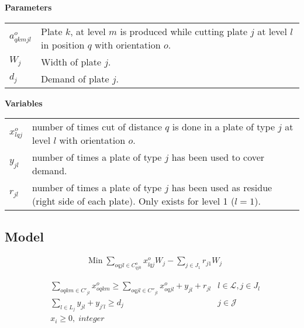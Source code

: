 \documentclass[a4paper,11pt]{article}
\begin{document}
    \vskip 0.3cm

    \textbf{Parameters}

    \begin{tabular}{p{20mm}p{120mm}}
        $a^o_{qkmjl}$ & Plate $k$, at level $m$ is produced while cutting plate $j$ at level $l$ in position $q$ with orientation $o$. \\
        $W_j$ & Width of plate $j$.\\
        $d_j$ & Demand of plate $j$.\\
    \end{tabular}

    \vskip 0.3cm

    \textbf{Variables}

    \begin{tabular}{p{20mm}p{120mm}}
        $x^o_{lqj}$ & number of times cut of distance $q$ is done in a plate of type $j$ at level $l$ with orientation $o$.\\
         $y_{jl}$ & number of times a plate of type $j$ has been used to cover demand.\\
         $r_{jl}$ & number of times a plate of type $j$ has been used as residue (right side of each plate). Only exists for level 1 ($l=1$).\\
    \end{tabular}

    \subsection{Model}

    \begin{align}
        & \text{Min}\; \sum_{oqjl \in C^o_{qj0}} x^o_{lqj} W_j - \sum_{j \in J_1} r_{j1} W_j
    \end{align}

    \begin{align}
        & \sum_{oqkm \in C'_{jl}} x^o_{oqkm} \geq \sum_{oqjl \in C''_{jl}} x^o_{oqjl} + y_{jl} + r_{jl}
            & l \in \mathcal{L}, j \in J_l \\
        & \sum_{l \in L_{j}} y_{jl} + y_{j'l} \geq d_j & j \in \mathcal{J} \\
        & x_{i} \geq 0,\; integer \\
    \end{align}
\end{document}
